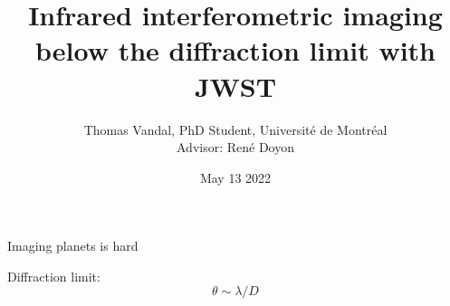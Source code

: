 \documentclass[10pt]{beamer}
\title{Infrared interferometric imaging below the diffraction limit with JWST}
\date{May 13 2022}
\author{Thomas Vandal, PhD Student, Université de Montréal\\ Advisor: René Doyon}
\institute{CRAQ Meeting 2022}
\begin{document}
{

\maketitle
}



\begin{frame}
  \centering
  \Huge
  Imaging planets is hard
\end{frame}

\begin{frame}
  \Huge
  Diffraction limit:
  \centering
  \begin{equation*}
    \theta \sim \lambda / D
  \end{equation*}
\end{frame}
\end{document}
